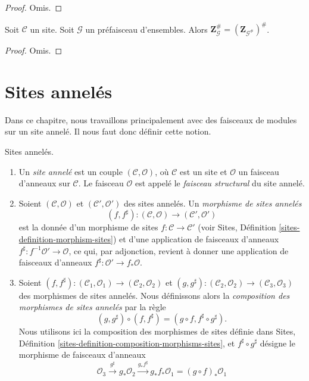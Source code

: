 \begin{proof}
Omis.
\end{proof}

\begin{lemma}
\label{lemma-may-sheafify-before-abelianize}
Soit $\mathcal{C}$ un site. Soit $\mathcal{G}$ un préfaisceau d'ensembles.
Alors $\mathbf{Z}_\mathcal{G}^\# = (\mathbf{Z}_{\mathcal{G}^\#})^\#$.
\end{lemma}

\begin{proof}
Omis.
\end{proof}








\section{Sites annelés}
\label{section-ringed-sites}

\noindent
Dans ce chapitre, nous travaillons principalement avec des faisceaux de modules
sur un site annelé. Il nous faut donc définir cette notion.

\begin{definition}
\label{definition-ringed-site}
Sites annelés.
\begin{enumerate}
\item Un {\it site annelé} est un couple $(\mathcal{C}, \mathcal{O})$, où
$\mathcal{C}$ est un site et $\mathcal{O}$ un faisceau d'anneaux sur
$\mathcal{C}$. Le faisceau $\mathcal{O}$ est appelé le {\it faisceau
structural} du site annelé.
\item Soient $(\mathcal{C}, \mathcal{O})$ et
$(\mathcal{C}', \mathcal{O}')$ des sites annelés. Un {\it morphisme de sites
annelés}
$$
(f, f^\sharp) :
(\mathcal{C}, \mathcal{O})
\longrightarrow
(\mathcal{C}', \mathcal{O}')
$$
est la donnée d'un morphisme de sites $f : \mathcal{C} \to \mathcal{C}'$ (voir
Sites, Définition \ref{sites-definition-morphism-sites}) et d'une application
de faisceaux d'anneaux $f^\sharp : f^{-1}\mathcal{O}' \to \mathcal{O}$, ce qui,
par adjonction, revient à donner une application de faisceaux d'anneaux
$f^\sharp : \mathcal{O}' \to f_*\mathcal{O}$.
\item Soient
$(f, f^\sharp) :
(\mathcal{C}_1, \mathcal{O}_1) \to (\mathcal{C}_2, \mathcal{O}_2)$ et
$(g, g^\sharp) :
(\mathcal{C}_2, \mathcal{O}_2) \to (\mathcal{C}_3, \mathcal{O}_3)$
des morphismes de sites annelés. Nous définissons alors la {\it composition des
morphismes de sites annelés} par la règle
$$
(g, g^\sharp) \circ (f, f^\sharp) = (g \circ f, f^\sharp \circ g^\sharp).
$$
Nous utilisons ici la composition des morphismes de sites définie dans Sites,
Définition \ref{sites-definition-composition-morphisms-sites}, et
$f^\sharp \circ g^\sharp$ désigne le morphisme de faisceaux d'anneaux
$$
\mathcal{O}_3 \xrightarrow{g^\sharp} g_*\mathcal{O}_2
\xrightarrow{g_*f^\sharp} g_*f_*\mathcal{O}_1 = (g \circ f)_*\mathcal{O}_1
$$
\end{enumerate}
\end{definition}







